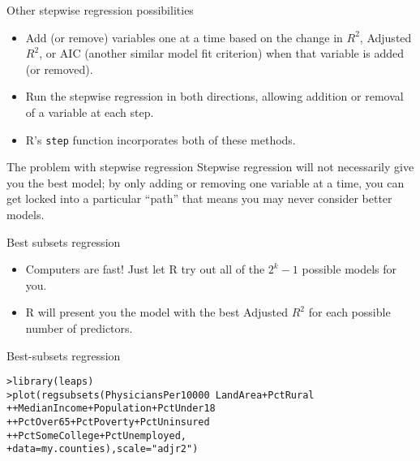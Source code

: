 \documentclass{beamer}\usepackage[]{graphicx}\usepackage[]{color}
\makeatletter
\newcommand{\hlstr}[1]{\textcolor[rgb]{1,0.894,0.71}{#1}}%
\newcommand{\hlopt}[1]{\textcolor[rgb]{1,0.894,0.769}{#1}}%
\newcommand{\hlstd}[1]{\textcolor[rgb]{1,0.894,0.769}{#1}}%
\newcommand{\hlkwc}[1]{\textcolor[rgb]{0.78,0.941,0.545}{#1}}%
\newcommand{\hlkwd}[1]{\textcolor[rgb]{1,0.78,0.769}{#1}}%
\newenvironment{kframe}{%
 \def\at@end@of@kframe{}%
 \ifinner\ifhmode%
  \def\at@end@of@kframe{\end{minipage}}%
  \begin{minipage}{\columnwidth}%
 \fi\fi%
 \def\FrameCommand##1{\hskip\@totalleftmargin \hskip-\fboxsep
 \colorbox{shadecolor}{##1}\hskip-\fboxsep
     \hskip-\linewidth \hskip-\@totalleftmargin \hskip\columnwidth}%
 \MakeFramed {\advance\hsize-\width
   \@totalleftmargin\z@ \linewidth\hsize
   \@setminipage}}%
 {\par\unskip\endMakeFramed%
 \at@end@of@kframe}
\newenvironment{knitrout}{}{} %
\makeatother
\begin{document}
\begin{darkframes}
    \begin{frame}{Other stepwise regression possibilities}
      \begin{itemize}
        \item Add (or remove) variables one at a time based on the change in $R^2$,  Adjusted $R^2$, or AIC (another similar model fit criterion) when that variable is added (or removed).
        \item Run the stepwise regression in both directions, allowing addition or removal of a variable at each step.
        \item R's \texttt{step} function incorporates both of these methods.
      \end{itemize}
    \end{frame}

    \begin{frame}{The problem with stepwise regression}
      Stepwise regression will not necessarily give you the best model; by only adding or removing one variable at a time, you can get locked into a particular ``path'' that means you may never consider better models.
    \end{frame}

    \begin{frame}{Best subsets regression}
      \begin{itemize}
        \item Computers are fast! Just let R try out all of the $2^k-1$ possible models for you.
        \item R will present you the model with the best Adjusted $R^2$ for each possible number of predictors.
      \end{itemize}
    \end{frame}

    \begin{frame}[fragile]{Best-subsets regression}
      \fontsm
\begin{knitrout}
\begin{kframe}
\begin{alltt}
\hlstd{> }\hlkwd{library}\hlstd{(leaps)}
\hlstd{> }\hlkwd{plot}\hlstd{(}\hlkwd{regsubsets}\hlstd{(PhysiciansPer10000} \hlopt{~} \hlstd{LandArea} \hlopt{+} \hlstd{PctRural}
\hlstd{+ }                 \hlopt{+} \hlstd{MedianIncome} \hlopt{+} \hlstd{Population} \hlopt{+} \hlstd{PctUnder18}
\hlstd{+ }                 \hlopt{+} \hlstd{PctOver65} \hlopt{+} \hlstd{PctPoverty} \hlopt{+} \hlstd{PctUninsured}
\hlstd{+ }                 \hlopt{+} \hlstd{PctSomeCollege} \hlopt{+} \hlstd{PctUnemployed,}
\hlstd{+ }                 \hlkwc{data}\hlstd{=my.counties),} \hlkwc{scale}\hlstd{=}\hlstr{"adjr2"}\hlstd{)}
\end{alltt}
\end{kframe}
\end{knitrout}
    \end{frame}


\end{darkframes}
\end{document}
